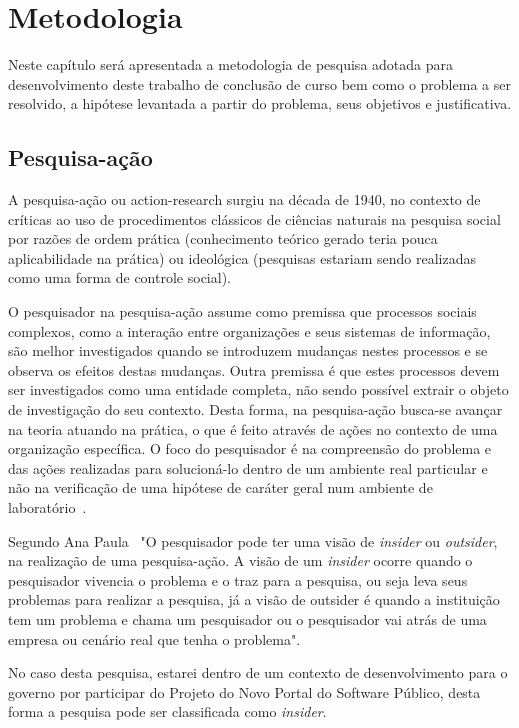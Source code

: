 \chapter{Metodologia}
\label{sec:metodologia}

Neste capítulo será apresentada a metodologia de pesquisa adotada para desenvolvimento 
deste trabalho de conclusão de curso bem como o problema a ser resolvido, a hipótese 
levantada a partir do problema, seus objetivos e justificativa.

\section{Pesquisa-ação}

A pesquisa-ação ou action-research surgiu na década de 1940, no contexto de críticas ao uso
de procedimentos clássicos de ciências naturais na pesquisa social por razões de ordem prática 
(conhecimento teórico gerado teria pouca aplicabilidade na prática) ou ideológica (pesquisas estariam
sendo realizadas como uma forma de controle social)\cite{gil2010metodos}.

O pesquisador na pesquisa-ação
assume como premissa que processos sociais complexos, como a interação
entre organizações e seus sistemas de informação, são melhor investigados
quando se introduzem mudanças nestes processos e se observa os efeitos
destas mudanças. Outra premissa é que estes processos devem ser
investigados como uma entidade completa, não sendo possível extrair o objeto
de investigação do seu contexto. Desta forma, na pesquisa-ação busca-se avançar na teoria 
atuando na prática, o que é feito através de
ações no contexto de uma organização específica. O foco do pesquisador é na
compreensão do problema e das ações realizadas para solucioná-lo dentro de
um ambiente real particular e não na verificação de uma hipótese de caráter
geral num ambiente de laboratório~\cite{fuks2008suporte}.

Segundo Ana Paula~\cite{dos2012aplicaccao} "O pesquisador pode ter uma visão de \emph{insider}
ou \emph{outsider}, na realização de uma pesquisa-ação.
A visão de um \emph{insider} ocorre quando o pesquisador vivencia o problema e o traz para a pesquisa,
ou seja leva seus problemas para realizar a pesquisa, já a visão de outsider é quando a instituição
tem um problema e chama um pesquisador ou o pesquisador vai atrás de uma empresa ou cenário
real que tenha o problema". 

No caso desta pesquisa, estarei dentro de um contexto de 
desenvolvimento para o governo por participar do Projeto do Novo Portal do Software
Público, desta forma a pesquisa pode ser classificada como \emph{insider}.


